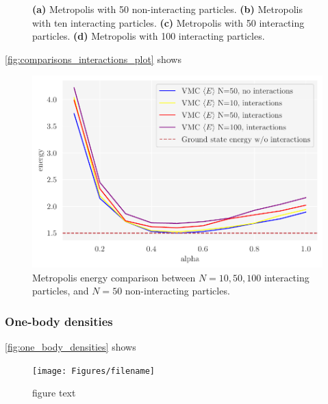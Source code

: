 \begin{figure}[!htb]
\qquad
{}
\caption{\textbf{(a)} Metropolis with 50 non-interacting particles. \textbf{(b)} Metropolis with ten interacting particles. \textbf{(c)} Metropolis with 50 interacting particles. \textbf{(d)} Metropolis with 100 interacting particles.}
\label{fig:interactions_plot}
\end{figure}

\autoref{fig:comparisons_interactions_plot} shows

\begin{figure}[H]
\begin{center}\includegraphics[scale=0.5]{latex/figures/grid_search_analytical_w_interactions_all_N.pdf}
\end{center}
\caption{Metropolis energy comparison between $N=10, 50, 100$ interacting particles, and $N=50$ non-interacting particles.}
\label{fig:fig1}
\end{figure}

\subsubsection{One-body densities}
\autoref{fig:one_body_densities} shows
\begin{figure}[H]
\begin{center}\texttt{[image: Figures/filename]}
\end{center}
\caption{figure text}
\label{fig:one_body_densities}
\end{figure}